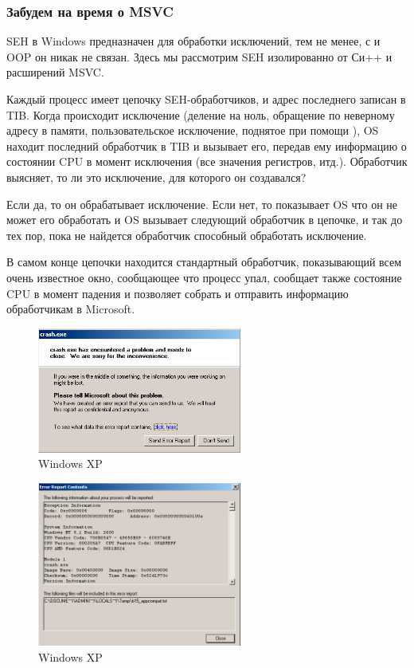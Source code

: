 \subsubsection{Забудем на время о MSVC}

\ac{SEH} в Windows предназначен для обработки исключений, тем не менее, с \Cpp и \ac{OOP} он никак не связан.
Здесь мы рассмотрим \ac{SEH} изолированно от Си++ и расширений MSVC.

Каждый процесс имеет цепочку \ac{SEH}-обработчиков, и адрес последнего записан в \ac{TIB}.
Когда происходит исключение (деление на ноль, обращение по неверному адресу в памяти, 
пользовательское исключение, поднятое при помощи ),
\ac{OS} находит последний обработчик в \ac{TIB} и вызывает его, 
передав ему информацию о состоянии \ac{CPU} в момент исключения
(все значения регистров, итд.).
Обработчик выясняет, то ли это исключение, для которого он создавался?

Если да, то он обрабатывает исключение.
Если нет, то показывает \ac{OS} что он не может его обработать и \ac{OS} вызывает следующий обработчик
в цепочке, и так до тех пор, пока не найдется обработчик способный обработать исключение.

В самом конце цепочки находится стандартный обработчик, показывающий всем очень известное окно, 
сообщающее что процесс упал, 
сообщает также состояние \ac{CPU} в момент падения и позволяет собрать и отправить информацию обработчикам 
в Microsoft. 

\begin{figure}[H]
\centering
\includegraphics[width=0.6\textwidth]{OS/SEH/1/crash_xp1.png}
\caption{Windows XP}
\end{figure}

\begin{figure}[H]
\centering
\includegraphics[width=0.6\textwidth]{OS/SEH/1/crash_xp2.png}
\caption{Windows XP}
\end{figure}

